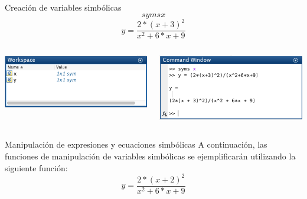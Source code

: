 \documentclass{bredelebeamer}
\begin{document}
\begin{frame}{Creación de variables simbólicas}
\begin{equation*}
syms x
\end{equation*}
\begin{equation*}
y = \frac{2*(x+3)^2}{x^2+6*x+9}
\end{equation*}
\begin{columns}
\begin{column}{0.5\textwidth}
\begin{center}
\includegraphics[scale=0.4]{images/fig1.png}
\end{center}
\end{column}
\begin{column}{0.5\textwidth}
\begin{center}
\includegraphics[scale=0.4]{images/fig2.png}
\end{center}
\end{column}
\end{columns}
\end{frame}

\begin{frame}{Manipulación de expresiones y ecuaciones simbólicas}
A continuación, las funciones de manipulación de variables simbólicas se ejemplificarán utilizando la siguiente función:
\begin{equation*}
y = \frac{2*(x+2)^2}{x^2+6*x+9}
\end{equation*}
\end{frame}
\end{document}
